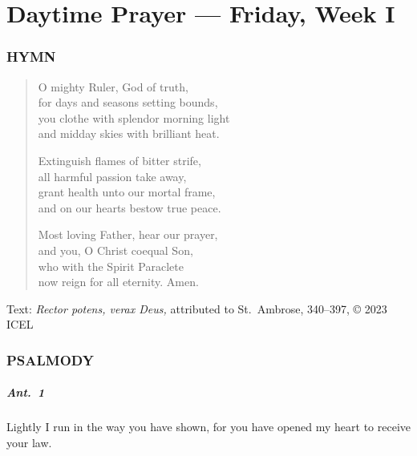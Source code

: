 \documentclass[12pt,twocolumn,letterpaper]{book}
\begin{document}
\chapter*{Daytime Prayer --- Friday, Week I}
\subsection*{HYMN}

\begin{verse}
O mighty Ruler, God of truth,\\
for days and seasons setting bounds,\\
you clothe with splendor morning light\\
and midday skies with brilliant heat.

Extinguish flames of bitter strife,\\
all harmful passion take away,\\
grant health unto our mortal frame,\\
and on our hearts bestow true peace.

Most loving Father, hear our prayer,\\
and you, O Christ coequal Son,\\
who with the Spirit Paraclete\\
now reign for all eternity. Amen.
\end{verse}

\footnotesize

Text: \emph{Rector potens, verax Deus,} attributed to St.~Ambrose, 340--397, © 2023 ICEL

\normalsize

\subsection*{PSALMODY}

\paragraph{Ant.\ 1}{Lightly I run in the way you have shown, for you have opened my heart to receive your law.}
\end{document}
